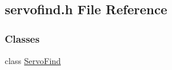 \hypertarget{a00022}{}\subsection{servofind.\+h File Reference}
\label{a00022}
\subsubsection*{Classes}
\begin{DoxyCompactItemize}
\item 
class \hyperlink{a00008}{Servo\+Find}
\end{DoxyCompactItemize}

